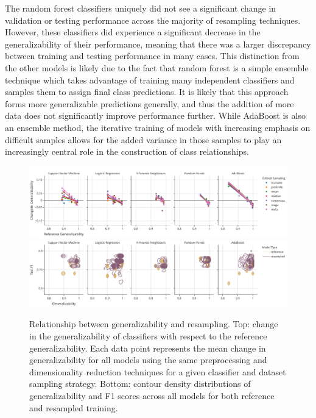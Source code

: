 \documentclass[10pt]{SelfArx} %
\begin{document}
The random forest classifiers uniquely did not see a significant change in validation or testing performance across the
majority of resampling techniques. However, these classifiers did experience a significant decrease in the
generalizability of their performance, meaning that there was a larger discrepancy between training and testing
performance in many cases. This distinction from the other models is likely due to the fact that random forest is a
simple ensemble technique which takes advantage of training many independent classifiers and samples them to assign
final class predictions. It is likely that this approach forms more generalizable predictions generally, and thus the
addition of more data does not significantly improve performance further. While AdaBoost is also an ensemble method,
the iterative training of models with increasing emphasis on difficult samples allows for the added variance in those
samples to play an increasingly central role in the construction of class relationships.

\begin{figure}[bht!]\centering
\includegraphics[width=\linewidth]{figures/2a.pdf}
\includegraphics[width=\linewidth]{figures/2b.pdf}
\caption{Relationship between generalizability and resampling. Top: change in the generalizability of classifiers with
respect to the reference generalizability. Each data point represents the mean change in generalizability for all
models using the same preprocessing and dimensionality reduction techniques for a given classifier and dataset sampling
strategy. Bottom: contour density distributions of generalizability and F1 scores across all models for both reference
and resampled training.
}
\label{fig:change_in_gen}
\end{figure}
\end{document}

